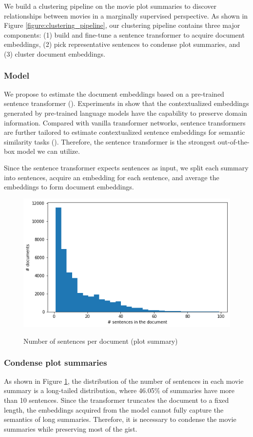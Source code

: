 \documentclass{article}
\begin{document}
\begin{multicols}{2}
We build a clustering pipeline on the movie plot summaries to discover relationships between movies in a marginally supervised perspective. As shown in Figure \ref{figure:clustering_pipeline}, our clustering pipeline contains three major components: (1) build and fine-tune a sentence transformer to acquire document embeddings, (2) pick representative sentences to condense plot summaries, and (3) cluster document embeddings.

\subsubsection{Model}
We propose to estimate the document embeddings based on a pre-trained sentence transformer (\cite{reimers-gurevych-2019-sentence}). Experiments in \cite{aharoni-goldberg-2020-unsupervised} show that the contextualized embeddings generated by pre-trained language models have the capability to preserve domain information. Compared with vanilla transformer networks, sentence transformers are further tailored to estimate contextualized sentence embeddings for semantic similarity tasks (\cite{reimers-gurevych-2019-sentence}). Therefore, the sentence transformer is the strongest out-of-the-box model we can utilize.

Since the sentence transformer expects sentences as input, we split each summary into sentences, acquire an embedding for each sentence, and average the embeddings to form document embeddings.

\begin{figure}
\caption{Number of sentences per document (plot summary)}
\centering
\includegraphics[width=5in]{figures/sents_per_doc.png}
\label{figure:sents_per_doc}
\end{figure}

\subsubsection{Condense plot summaries}
As shown in Figure \ref{figure:sents_per_doc}, the distribution of the number of sentences in each movie summary is a long-tailed distribution, where 46.05\% of summaries have more than 10 sentences. Since the transformer truncates the document to a fixed length, the embeddings acquired from the model cannot fully capture the semantics of long summaries. Therefore, it is necessary to condense the movie summaries while preserving most of the gist.


\end{multicols}
\end{document}
